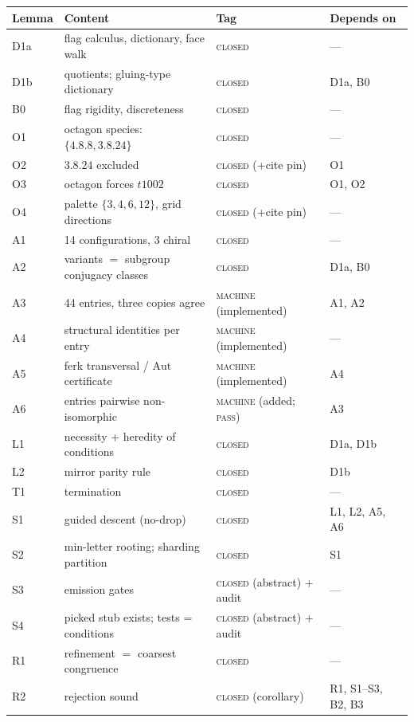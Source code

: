 \documentclass[11pt]{article}
\theoremstyle{definition}
\newcommand{\Aut}{\mathrm{Aut}}
\begin{document}
\begingroup
\footnotesize
\begin{center}
\begin{tabular}{llll}
Lemma & Content & Tag & Depends on \\
\hline
D1a & flag calculus, dictionary, face walk & \textsc{closed} & --- \\
D1b & quotients; gluing-type dictionary & \textsc{closed} & D1a, B0 \\
B0 & flag rigidity, discreteness & \textsc{closed} & --- \\
O1 & octagon species: $\{4.8.8, 3.8.24\}$ & \textsc{closed} & --- \\
O2 & $3.8.24$ excluded & \textsc{closed} (+cite pin) & O1 \\
O3 & octagon forces $t1002$ & \textsc{closed} & O1, O2 \\
O4 & palette $\{3,4,6,12\}$, grid directions & \textsc{closed} (+cite pin) & --- \\
A1 & 14 configurations, 3 chiral & \textsc{closed} & --- \\
A2 & variants $=$ subgroup conjugacy classes & \textsc{closed} & D1a, B0 \\
A3 & 44 entries, three copies agree & \textsc{machine} (implemented) & A1, A2 \\
A4 & structural identities per entry & \textsc{machine} (implemented) & --- \\
A5 & ferk transversal / $\Aut$ certificate & \textsc{machine} (implemented) & A4 \\
A6 & entries pairwise non-isomorphic & \textsc{machine} (added; \textsc{pass}) & A3 \\
L1 & necessity + heredity of conditions & \textsc{closed} & D1a, D1b \\
L2 & mirror parity rule & \textsc{closed} & D1b \\
T1 & termination & \textsc{closed} & --- \\
S1 & guided descent (no-drop) & \textsc{closed} & L1, L2, A5, A6 \\
S2 & min-letter rooting; sharding partition & \textsc{closed} & S1 \\
S3 & emission gates & \textsc{closed} (abstract) + audit & --- \\
S4 & picked stub exists; tests = conditions & \textsc{closed} (abstract) + audit & --- \\
R1 & refinement $=$ coarsest congruence & \textsc{closed} & --- \\
R2 & rejection sound & \textsc{closed} (corollary) & R1, S1--S3, B2, B3 \\

\end{tabular}
\end{center}
\end{document}
